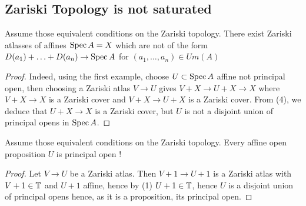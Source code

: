 \documentclass{article}
\begin{document}
\subsection{Zariski Topology is not saturated}
\begin{example}{\label{ex:weirdZarAtlasses}}
    Assume those equivalent conditions on the Zariski topology.
    There exist Zariski atlasses of affines $\operatorname{Spec} A = X$ which are not of the form $D(a_1) + \hdots + D(a_n) \to \operatorname{Spec} A$ for $(a_1,\hdots,a_n) \in Um(A)$
\end{example}
\begin{proof}
     Indeed, using the first example, choose $U \subset \operatorname{Spec} A$ affine not principal open, then choosing a Zariski atlas $V \to U$ gives $V + X \to U + X \to X$ where $V + X \to X$ is a Zariski cover and $V + X \to U + X $ is a Zariski cover.
    From (4), we deduce that $U +X \to X$ is a Zariski cover, but $U$ is not a disjoint union of principal opens in $\operatorname{Spec} A$. 
\end{proof}
\begin{example}
     Assume those equivalent conditions on the Zariski topology. Every affine open proposition $U$ is principal open !
\end{example}
\begin{proof}
    Let $V \to U$ be a Zariski atlas. Then $V +1  \to U + 1$ is a Zariski atlas with $V+1 \in \mathbb{T}$ and $U + 1$ affine, hence by (1) $U+ 1 \in \mathbb{T}$, hence $U$ is a disjoint union of principal opens hence, as it is a proposition, its principal open.
 \end{proof}


    
\end{document}
